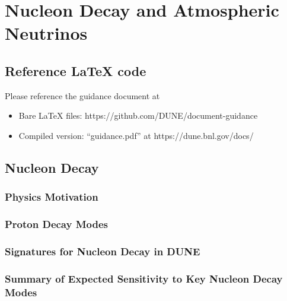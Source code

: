 \chapter{Nucleon Decay and Atmospheric Neutrinos}
\label{ch:physics-atmpdk}

\section{Reference LaTeX code}

Please reference the guidance document at 

\begin{itemize}
\item Bare LaTeX files: https://github.com/DUNE/document-guidance
\item Compiled version: ``guidance.pdf'' at https://dune.bnl.gov/docs/
\end{itemize}


\section{Nucleon Decay}
\label{sec:physics-atmpdk-ndk}

\subsection{Physics Motivation}
\label{sec:physics-atmpdk-ndk-motiv}

\subsection{Proton Decay Modes} 
\label{sec:physics-atmpdk-ndk-modes}


\subsection{Signatures for Nucleon Decay in DUNE}
\label{sec:physics-atmpdk-ndk-sig}


\subsection{\boldmath Summary of Expected Sensitivity to Key Nucleon Decay Modes}
\label{sec:physics-atmpdk-ndk-sensitivity}



